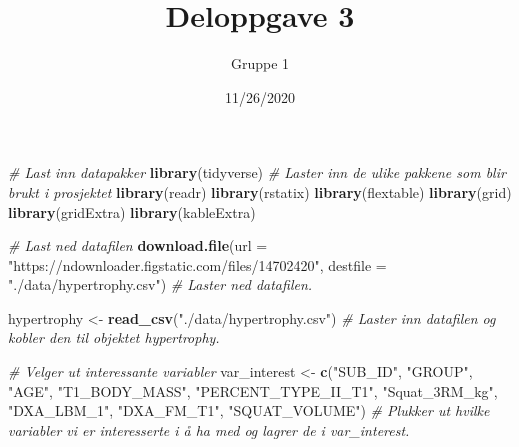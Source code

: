 \documentclass[
]{article}
\title{Deloppgave 3}
\author{Gruppe 1}
\date{11/26/2020}
\newenvironment{Shaded}{\begin{snugshade}}{\end{snugshade}}
\newcommand{\CommentTok}[1]{\textcolor[rgb]{0.56,0.35,0.01}{\textit{#1}}}
\newcommand{\DataTypeTok}[1]{\textcolor[rgb]{0.13,0.29,0.53}{#1}}
\newcommand{\KeywordTok}[1]{\textcolor[rgb]{0.13,0.29,0.53}{\textbf{#1}}}
\newcommand{\NormalTok}[1]{#1}
\newcommand{\StringTok}[1]{\textcolor[rgb]{0.31,0.60,0.02}{#1}}
\begin{document}
\maketitle

\begin{Shaded}
\begin{Highlighting}[]
\CommentTok{# Last inn datapakker}
\KeywordTok{library}\NormalTok{(tidyverse) }\CommentTok{# Laster inn de ulike pakkene som blir brukt i prosjektet}
\KeywordTok{library}\NormalTok{(readr)}
\KeywordTok{library}\NormalTok{(rstatix)}
\KeywordTok{library}\NormalTok{(flextable)}
\KeywordTok{library}\NormalTok{(grid)}
\KeywordTok{library}\NormalTok{(gridExtra)}
\KeywordTok{library}\NormalTok{(kableExtra)}


\CommentTok{# Last ned datafilen}
\KeywordTok{download.file}\NormalTok{(}\DataTypeTok{url =} \StringTok{"https://ndownloader.figstatic.com/files/14702420"}\NormalTok{, }
              \DataTypeTok{destfile =} \StringTok{"./data/hypertrophy.csv"}\NormalTok{) }\CommentTok{# Laster ned datafilen.}

\NormalTok{hypertrophy <-}\StringTok{ }\KeywordTok{read_csv}\NormalTok{(}\StringTok{"./data/hypertrophy.csv"}\NormalTok{)  }\CommentTok{# Laster inn datafilen og kobler den til objektet hypertrophy.}


\CommentTok{# Velger ut interessante variabler}
\NormalTok{var_interest <-}\StringTok{ }\KeywordTok{c}\NormalTok{(}\StringTok{"SUB_ID"}\NormalTok{, }\StringTok{"GROUP"}\NormalTok{, }\StringTok{"AGE"}\NormalTok{, }\StringTok{"T1_BODY_MASS"}\NormalTok{, }\StringTok{"PERCENT_TYPE_II_T1"}\NormalTok{, }
                  \StringTok{"Squat_3RM_kg"}\NormalTok{, }\StringTok{"DXA_LBM_1"}\NormalTok{, }\StringTok{"DXA_FM_T1"}\NormalTok{, }\StringTok{"SQUAT_VOLUME"}\NormalTok{) }\CommentTok{# Plukker ut hvilke variabler vi er interesserte i å ha med og lagrer de i var_interest.}


\end{Highlighting}
\end{Shaded}
\end{document}

